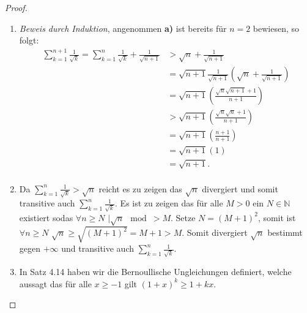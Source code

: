 \documentclass{../problemset}
\begin{document}
\begin{problem}
\begin{proof}
	\begin{enumerate}
		\item \textit{Beweis durch Induktion}, angenommen \textbf{a)} ist bereits für $n=2$ bewiesen, so folgt: \begin{align*}
			      \sum_{k=1}^{n+1} \frac{1}{\sqrt{k}} = \sum_{k=1}^{n} \frac{1}{\sqrt{k}} + \frac{1}{\sqrt{n + 1}} & > \sqrt{n} + \frac{1}{\sqrt{n + 1}}                                              \\
			                                                                                                       & = \sqrt{n+1} \frac{1}{\sqrt{n+1}} \left(\sqrt{n} + \frac{1}{\sqrt{n + 1}}\right) \\
			                                                                                                       & = \sqrt{n+1} \left(\frac{\sqrt{n}\sqrt{n+1} + 1}{n + 1}\right)                   \\
			                                                                                                       & > \sqrt{n+1} \left(\frac{\sqrt{n}\sqrt{n} + 1}{n + 1}\right)                     \\
			                                                                                                       & = \sqrt{n+1} \left(\frac{n + 1}{n + 1}\right)                                    \\
			                                                                                                       & = \sqrt{n+1} (1)                                                                 \\
			                                                                                                       & = \sqrt{n+1} \tag*{\checkmark}.                                                  \\
		      \end{align*}
		\item Da $\sum_{k=1}^{n} \frac{1}{\sqrt{k}} > \sqrt{n}$ reicht es zu zeigen das $\sqrt{n}$ divergiert und somit transitive auch $\sum_{k=1}^{n} \frac{1}{\sqrt{k}}$.
		      Es ist zu zeigen das für alle $M > 0$ ein $N \in \mathbb{N}$ existiert sodas $\forall n \ge N$ $\mid \sqrt{n} \mod > M$.
		      Setze $N = {(M + 1)}^2$, somit ist $\forall n \ge N$ $\sqrt{n} \ge \sqrt{{(M + 1)}^2} = M+1 > M$.
		      Somit divergiert $\sqrt{n}$ bestimmt gegen $+\infty$ und transitive auch $\sum_{k=1}^{n} \frac{1}{\sqrt{k}}$.
		      \checkmark
		\item In Satz 4.14 haben wir die Bernoullische Ungleichungen definiert, welche aussagt das für alle $x \ge -1$ gilt ${(1+x)}^k \ge 1 + kx$.

\end{enumerate}
\end{proof}
\end{problem}
\end{document}
